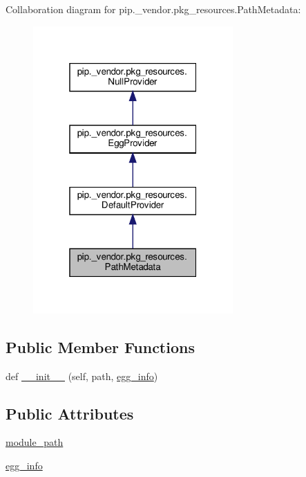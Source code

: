 Collaboration diagram for pip.\+\_\+vendor.\+pkg\+\_\+resources.\+Path\+Metadata\+:
\nopagebreak
\begin{figure}[H]
\begin{center}
\leavevmode
\includegraphics[width=217pt]{classpip_1_1__vendor_1_1pkg__resources_1_1PathMetadata__coll__graph}
\end{center}
\end{figure}
\subsection*{Public Member Functions}
\begin{DoxyCompactItemize}
\item 
def \hyperlink{classpip_1_1__vendor_1_1pkg__resources_1_1PathMetadata_a8f309bcb3bd5080e389d889442e1cdb4}{\+\_\+\+\_\+init\+\_\+\+\_\+} (self, path, \hyperlink{classpip_1_1__vendor_1_1pkg__resources_1_1PathMetadata_a0c70cc1d142e7cb2ac94ea43491cb871}{egg\+\_\+info})
\end{DoxyCompactItemize}
\subsection*{Public Attributes}
\begin{DoxyCompactItemize}
\item 
\hyperlink{classpip_1_1__vendor_1_1pkg__resources_1_1PathMetadata_aa5f1604a90ab416f53cae0824810a46c}{module\+\_\+path}
\item 
\hyperlink{classpip_1_1__vendor_1_1pkg__resources_1_1PathMetadata_a0c70cc1d142e7cb2ac94ea43491cb871}{egg\+\_\+info}
\end{DoxyCompactItemize}
